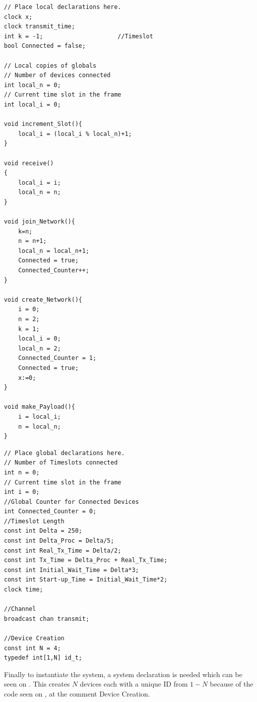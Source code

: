 \noindent\begin{minipage}{0.47\textwidth}
\begin{lstlisting}[style=UPPAAL,
caption={Local code for Device.}, label={device_local}]
// Place local declarations here.
clock x;
clock transmit_time;
int k = -1;                     //Timeslot
bool Connected = false;

// Local copies of globals
// Number of devices connected
int local_n = 0; 
// Current time slot in the frame
int local_i = 0;

void increment_Slot(){
    local_i = (local_i % local_n)+1;
}

void receive()
{
    local_i = i;
    local_n = n;
}

void join_Network(){
    k=n;
    n = n+1;
    local_n = local_n+1;
    Connected = true;
    Connected_Counter++;
}

void create_Network(){
    i = 0;
    n = 2;
    k = 1;
    local_i = 0;
    local_n = 2;
    Connected_Counter = 1;
    Connected = true;
    x:=0;
}

void make_Payload(){
    i = local_i;
    n = local_n;
}

\end{lstlisting}
\end{minipage}\hfill
\begin{minipage}{0.47\textwidth}
\begin{lstlisting}[style=UPPAAL,
caption={Code for the global declarations.}, label={uppaal_Global}]
// Place global declarations here.
// Number of Timeslots connected
int n = 0;         
// Current time slot in the frame
int i = 0;            
//Global Counter for Connected Devices                    
int Connected_Counter = 0;
//Timeslot Length
const int Delta = 250;                 
const int Delta_Proc = Delta/5;
const int Real_Tx_Time = Delta/2;
const int Tx_Time = Delta_Proc + Real_Tx_Time;
const int Initial_Wait_Time = Delta*3;
const int Start-up_Time = Initial_Wait_Time*2;
clock time;

//Channel
broadcast chan transmit;

//Device Creation
const int N = 4;
typedef int[1,N] id_t;
\end{lstlisting}
\end{minipage}

Finally to instantiate the system, a system declaration is needed which can be seen on .
This creates $N$ devices each with a unique ID from $1 - N$ because of the code seen on , at the comment Device Creation.

